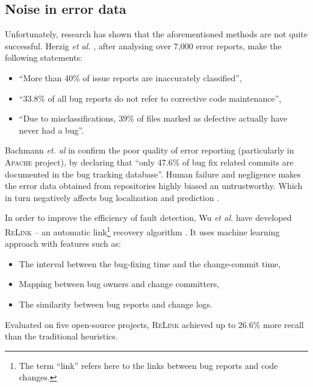 \documentclass{pracamgr}
\begin{document}
\subsection{Noise in error data}
\label{sec:noise}
Unfortunately, research has shown that the aforementioned methods are not quite successful. Herzig \textit{et al.} \cite{Herzig}, after analysing over 7,000 error reports, make the following statements:
\begin{itemize}
	\item ``More than 40\% of issue reports are inaccurately classified'',
	\item ``33.8\% of all bug reports do not refer to corrective code maintenance'',
	\item ``Due to misclassifications, 39\% of files marked as defective actually have never had a bug''.
\end{itemize}
Bachmann \textit{et. al} in \cite{Bachmann} confirm the poor quality of error reporting (particularly in \textsc{Apache} project), by declaring that ``only 47.6\% of bug fix related commits are documented in the bug tracking database''. Human failure and negligence makes the error data obtained from repositories highly biased an untrustworthy. Which in turn negatively affects bug localization and prediction \cites{Herzig, dealing, Kochnar}.

In order to improve the efficiency of fault detection, Wu \textit{et al.} have developed \textsc{ReLink} -- an automatic link\footnote{The term ``link'' refers here to the links between bug reports and code changes.} recovery algorithm \cite{ReLink}. It uses machine learning approach with features such as:
\begin{itemize}
	\item The interval between the bug-fixing time and the change-commit time,
	\item Mapping between bug owners and change committers,
	\item The similarity between bug reports and change logs.
\end{itemize}
Evaluated on five open-source projects, \textsc{ReLink} achieved up to 26.6\% more recall than the traditional heuristics.
\end{document}
